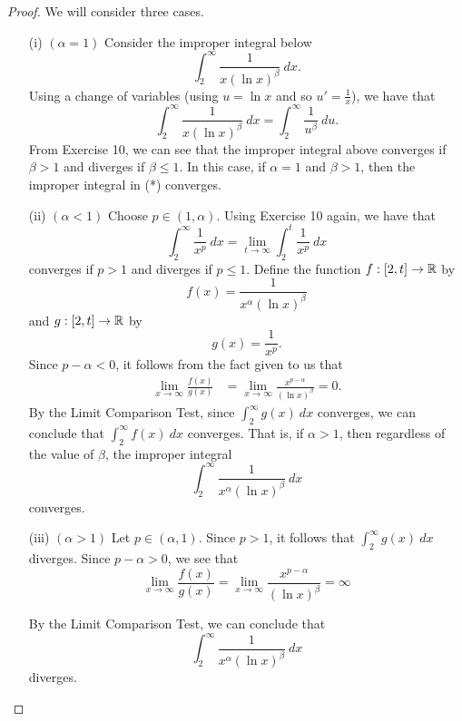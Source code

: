 \documentclass[a4paper]{article}
\begin{document}
\begin{proof}
We will consider three cases.
\begin{enumerate}
    \item[(i)] \( (\alpha =1) \) Consider the improper integral below
        \[  \int_{ 2 }^{ \infty  }  \frac{ 1 }{ x (\ln x)^{\beta} }  \ dx.  \tag{*}\]
        Using a change of variables (using \( u = \ln x  \) and so \( u' = \frac{ 1 }{ x }  \)), we have that 
        \[ \int_{ 2 }^{ \infty  }  \frac{ 1 }{ x (\ln x)^{\beta} }  \ dx =  \int_{ 2 }^{ \infty  } \frac{ 1 }{ u^{\beta} }  \ du.  \]
        From Exercise 10, we can see that the improper integral above converges if \( \beta > 1  \) and diverges if \( \beta \leq 1  \). In this case, if \( \alpha = 1  \) and \( \beta > 1  \), then the improper integral in (*) converges.
    \item[(ii)] \( (\alpha < 1) \) Choose \( p \in (1,\alpha) \). Using Exercise 10 again, we have that  
        \[  \int_{ 2 }^{ \infty  }  \frac{ 1 }{ x^{p} }  \ dx = \lim_{ t \to \infty  }  \int_{ 2  }^{  t  }  \frac{ 1 }{ x^{p} }  \ dx  \]
        converges if \( p > 1  \) and diverges if \( p \leq 1  \). Define the function \( f: [2, t] \to \mathbb{R}     \) by
        \[  f(x) = \frac{ 1 }{ x^{\alpha} (\ln x)^{\beta} }  \]
        and \( g: [2,t] \to \mathbb{R}  \) by
        \[  g(x) = \frac{ 1 }{ x^{p} }. \]
        Since \( p - \alpha < 0  \), it follows from the fact given to us that 
        \begin{align*}
            \lim_{ x \to \infty  }  \frac{ f(x) }{ g(x) } &= \lim_{ x \to \infty  } \frac{ x^{p - \alpha} }{ (\ln x)^{\beta} } = 0.
        \end{align*}
       By the Limit Comparison Test, since \( \int_{ 2 }^{ \infty  }  g(x)  \ dx  \) converges, we can conclude that \( \int_{ 2 }^{ \infty  } f(x) \ dx   \) converges. That is, if \( \alpha > 1  \), then regardless of the value of \( \beta  \), the improper integral   
       \[  \int_{ 2 }^{ \infty  }  \frac{ 1  }{ x^{\alpha} (\ln x)^{\beta} }  \ dx \]
       converges.
    \item[(iii)] \( (\alpha > 1) \) Let \( p \in (\alpha,1) \). Since \( p > 1  \), it follows that 
        \(  \int_{ 2 }^{ \infty  }  g(x)  \ dx  \)
        diverges. Since \( p - \alpha > 0  \), we see that 
        \[  \lim_{ x \to \infty  }  \frac{f(x)}{ g(x) }  = \lim_{ x \to \infty  } \frac{ x^{p - \alpha} }{ (\ln x)^{\beta} } = \infty  \]
        
        By the Limit Comparison Test, we can conclude that 
        \[  \int_{ 2 }^{ \infty  }  \frac{ 1 }{ x^{\alpha} (\ln x)^{\beta} }  \ dx  \]
        diverges.
\end{enumerate}
\end{proof}
\end{document}
